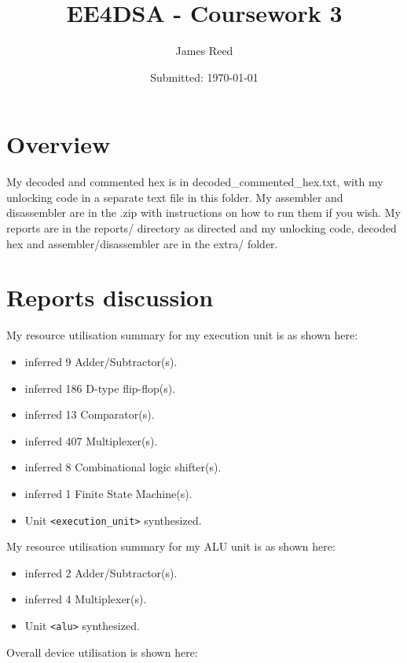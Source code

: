 \documentclass[11pt, oneside, titlepage]{article}
\author{James Reed}
\title{EE4DSA - Coursework 3}
\date{Submitted: \today}
\begin{document}
\maketitle
\newpage

\section{Overview}
My decoded and commented hex is in decoded\_commented\_hex.txt, with my unlocking code in a separate text file in this folder. My assembler and disassembler are in the .zip with instructions on how to run them if you wish. My reports are in the reports/ directory as directed and my unlocking code, decoded hex and assembler/disassembler are in the extra/ folder.

\section{Reports discussion}

My resource utilisation summary for my execution unit is as shown here:
 
\begin{itemize}

	\item inferred   9 Adder/Subtractor(s).
	\item inferred 186 D-type flip-flop(s).
	\item inferred  13 Comparator(s).
	\item inferred 407 Multiplexer(s).
	\item inferred   8 Combinational logic shifter(s).
	\item inferred   1 Finite State Machine(s).
  \item Unit \verb!<execution_unit>! synthesized.
  
\end{itemize}

My resource utilisation summary for my ALU unit is as shown here:

\begin{itemize}

  \item inferred   2 Adder/Subtractor(s).
	\item inferred   4 Multiplexer(s).
	\item Unit \verb!<alu>! synthesized.

\end{itemize}

Overall device utilisation is shown here:
\end{document}
